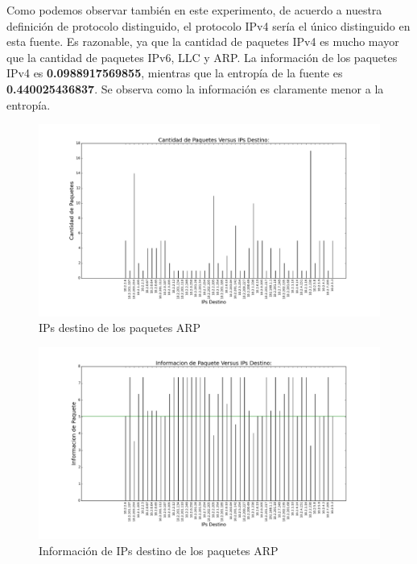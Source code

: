 Como podemos observar también en este experimento, de acuerdo a nuestra definición de protocolo distinguido, el protocolo IPv4 sería el único distinguido en esta fuente. Es razonable, ya que la cantidad de paquetes IPv4 es mucho mayor que la cantidad de paquetes IPv6, LLC y ARP. La información de los paquetes IPv4 es \textbf{0.0988917569855}, mientras que la entropía de la fuente es \textbf{0.440025436837}. Se observa como la información es claramente menor a la entropía.

\begin{figure}[H]
       \centering
       \includegraphics[width=1\textwidth]{../resultados/labo-corrida3/histogram_dst.png}
       \caption{IPs destino de los paquetes ARP}
       \label{red-Starbucks-dst}
\end{figure}

\begin{figure}[H]
       \centering
       \includegraphics[width=1\textwidth]{../resultados/labo-corrida3/histogram_dst_information.png}
       \caption{Información de IPs destino de los paquetes ARP}
       \label{red-Starbucks-dst-information}
\end{figure}


